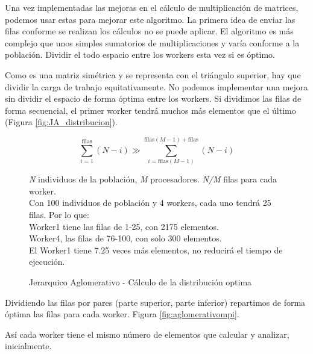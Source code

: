	
		Una vez implementadas las mejoras en el cálculo de multiplicación de matrices, podemos usar estas para mejorar este algoritmo. La primera idea de enviar las filas conforme se realizan los cálculos no se puede aplicar. El algoritmo es más complejo que unos simples sumatorios de multiplicaciones y varía conforme a la población. Dividir el todo espacio entre los workers esta vez si es óptimo.
		
		Como es una matriz simétrica y se representa con el triángulo superior, hay que dividir la carga de trabajo equitativamente. No podemos implementar una mejora sin dividir el espacio de forma óptima entre los workers. Si dividimos las filas de forma secuencial, el primer worker tendrá muchos más elementos que el último (Figura \ref{fig:JA_distribucion}). 
	
		
		\begin{figure}
			
			\begin{mdframed}[roundcorner=5pt]
				\[
				\sum_{i=1}^{\text{filas}} (N - i) \gg \sum_{i=\text{filas}(M-1)}^{\text{filas}(M-1) + \text{filas}} (N - i)
				\]
				\begin{tcolorbox}[boxrule=0.5pt, fontupper=\small]
					
					\textit{N} individuos de la población, \textit{M} procesadores. \textit{N/M} filas para cada worker.\\
					
					Con 100 individuos de población y 4 workers, cada uno tendrá 25 filas. Por lo que:\\
					Worker1 tiene las filas de 1-25, con 2175 elementos. \\
					Worker4, las filas de 76-100, con solo 300 elementos. \\
					El Worker1 tiene 7.25 veces más elementos, no reducirá el tiempo de ejecución.
								
				\end{tcolorbox}
				
			\end{mdframed}
		\label{"fig:JA_distribucion"}
		\caption{Jerarquico Aglomerativo - Cálculo de la distribución optima}
		\end{figure}
		
		
		Dividiendo las filas por pares (parte superior, parte inferior) repartimos de forma óptima las filas para cada worker. Figura \ref{fig:aglomerativompi}.
		
		Así cada worker tiene el mismo número de elementos que calcular y analizar, inicialmente. 
		
